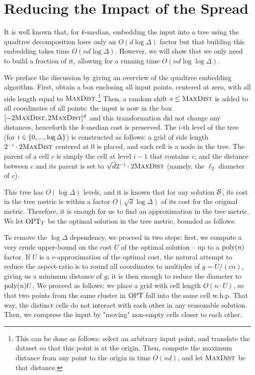 \section{Reducing the Impact of the Spread}
\newcommand{\boxsize}{\textsc{MaxDist}}

It is well known that, for $k$-median, embedding the input into a tree using the quadtree decomposition loses only an $O(d \log \Delta)$ factor but that
building this embedding takes time $O(nd \log \Delta)$. However, we will show that we only need to build a fraction of it, allowing for a running time $O(nd
\log \log \Delta)$. 

We preface the discussion by giving an overview of the quadtree embedding algorithm. First, obtain a box enclosing all input points, centered at zero, with all
side length equal to $\boxsize$.\footnote{This can be done as follows: select an arbitrary input point, and translate the dataset so that this point is at the
origin. Then, compute the maximum distance from any point to the origin in time $O(nd)$, and let $\boxsize$ be that distance.} Then, a random shift $s \leq
\boxsize$ is added to all coordinates of all points: the input is now in the box $[-2\boxsize, 2\boxsize]^d$ and this transformation did not change any
distances, henceforth the $k$-median cost is preserved.  The $i$-th level of the tree (for $i \in \left\{ 0, ..., \log \Delta \right\}$) is constructed as follows:
a grid of side length $2^{-i} \cdot 2\boxsize$ centered at $0$ is placed, and each cell is a node in the tree.  The parent of a cell $c$ is simply the cell at
level $i-1$ that contains $c$, and the distance between $c$ and its parent is set to $\sqrt{d}2^{-i} \cdot 2\boxsize$ (namely, the $\ell_2$ diameter of $c$).
 
This tree has $O(\log \Delta)$ levels, and it is known that for any solution $\mathcal S$, its cost in the tree metric is within a factor $O(\sqrt d \log \Delta)$ of
its cost for the original metric. Therefore, it is enough for us to find an approximation in the tree metric. We let $\text{OPT}_T$ be the optimal solution in the
tree metric, bounded as follows:
 
To remove the $\log\Delta$ dependency, we proceed in two steps: first, we compute a very crude upper-bound on the cost $U$ of the optimal
solution -- up to a $\operatorname{poly}(n)$ factor.  If $U$ is a $c$-approximation of the optimal cost, the natural attempt to reduce the aspect-ratio is to round all
coordinates to multiples of $g = U/(cn)$, giving us a minimum distance of $g$; it is then enough to reduce the diameter to $\operatorname{poly}(n) U$. We proceed as
follows: we place a grid with cell length $O(n \cdot U)$, so that two points from the same cluster in $\text{OPT}$ fall into the same cell w.h.p. That way, the
distinct cells do not interact with each other in any reasonable solution.  Then, we compress the input by "moving" non-empty cells closer to each other.

